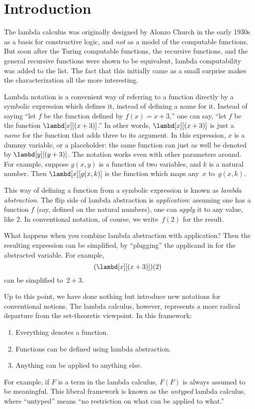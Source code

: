\documentclass[../../../include/open-logic-section]{subfiles}
\begin{document}
\chapter{Introduction}

The lambda calculus was originally designed by Alonzo Church in the
early 1930s as a basis for constructive logic, and \emph{not} as a
model of the computable functions. But soon after the Turing
computable functions, the recursive functions, and the general
recursive functions were shown to be equivalent, lambda computability
was added to the list. The fact that this initially came as a small
surprise makes the characterization all the more interesting.

Lambda notation is a convenient way of referring to a function
directly by a symbolic expression which defines it, instead of
defining a name for it. Instead of saying ``let $f$ be the function
defined by $f(x) = x + 3$,'' one can say, ``let $f$ be the function
$\lambd[x][(x + 3)]$.''  In other words, $\lambd[x][(x+3)]$ is just a
\emph{name} for the function that adds three to its argument. In this
expression, $x$ is a dummy variable, or a placeholder: the same
function can just as well be denoted by $\lambd[y][(y + 3)]$. The
notation works even with other parameters around. For example, suppose
$g(x, y)$ is a function of two variables, and $k$ is a natural
number. Then $\lambd[x][g(x,k)]$ is the function which maps any~$x$
to~$g(x, k)$.

This way of defining a function from a symbolic expression is known as
\emph{lambda abstraction}. The flip side of lambda abstraction is
\emph{application}: assuming one has a function $f$ (say, defined on
the natural numbers), one can \emph{apply} it to any value, like 2. In
conventional notation, of course, we write~$f(2)$ for the result.

What happens when you combine lambda abstraction with application?
Then the resulting expression can be simplified, by ``plugging'' the
applicand in for the abstracted variable. For example,
\[
(\lambd[x][(x + 3)])(2)
\]
can be simplified to~$2 + 3$.

Up to this point, we have done nothing but introduce new notations for
conventional notions. The lambda calculus, however, represents a more
radical departure from the set-theoretic viewpoint. In this framework:
\begin{enumerate}
\item Everything denotes a function.
\item Functions can be defined using lambda abstraction.
\item Anything can be applied to anything else.
\end{enumerate}
For example, if $F$ is a term in the lambda calculus, $F(F)$ is always
assumed to be meaningful. This liberal framework is known as the
\emph{untyped} lambda calculus, where ``untyped'' means ``no
restriction on what can be applied to what.''
\end{document}
